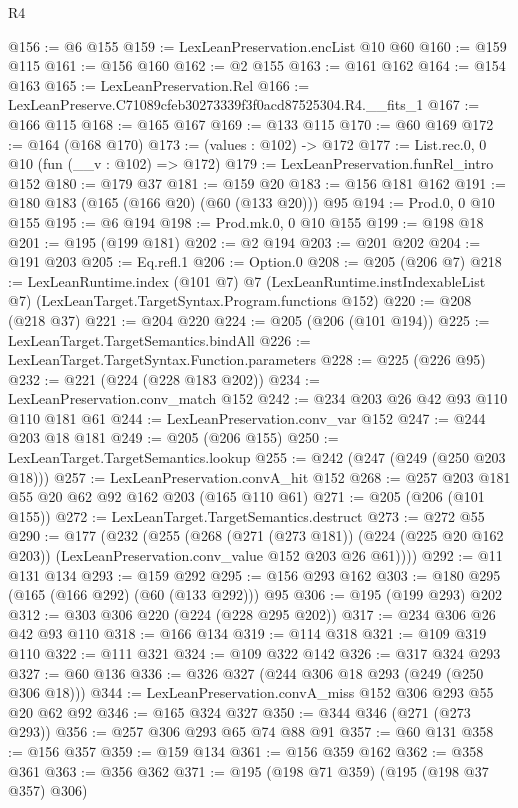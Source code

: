 \begin{lexlean}{R4}
\begin{coremodule}
@156 := @6 @155
@159 := LexLeanPreservation.encList @10 @60
@160 := @159 @115
@161 := @156 @160
@162 := @2 @155
@163 := @161 @162
@164 := @154 @163
@165 := LexLeanPreservation.Rel
@166 := LexLeanPreserve.C71089cfeb30273339f3f0acd87525304.R4.__fits_1
@167 := @166 @115
@168 := @165 @167
@169 := @133 @115
@170 := @60 @169
@172 := @164 (@168 @170)
@173 := (values : @102) -> @172
@177 := List.rec.{0, 0} @10 (fun (__v : @102) => @172)
@179 := LexLeanPreservation.funRel_intro @152
@180 := @179 @37
@181 := @159 @20
@183 := @156 @181 @162
@191 := @180 @183 (@165 (@166 @20) (@60 (@133 @20))) @95
@194 := Prod.{0, 0} @10 @155
@195 := @6 @194
@198 := Prod.mk.{0, 0} @10 @155
@199 := @198 @18
@201 := @195 (@199 @181)
@202 := @2 @194
@203 := @201 @202
@204 := @191 @203
@205 := Eq.refl.{1}
@206 := Option.{0}
@208 := @205 (@206 @7)
@218 := LexLeanRuntime.index
    (@101 @7)
    @7
    (LexLeanRuntime.instIndexableList @7)
    (LexLeanTarget.TargetSyntax.Program.functions @152)
@220 := @208 (@218 @37)
@221 := @204 @220
@224 := @205 (@206 (@101 @194))
@225 := LexLeanTarget.TargetSemantics.bindAll
@226 := LexLeanTarget.TargetSyntax.Function.parameters
@228 := @225 (@226 @95)
@232 := @221 (@224 (@228 @183 @202))
@234 := LexLeanPreservation.conv_match @152
@242 := @234 @203 @26 @42 @93 @110 @110 @181 @61
@244 := LexLeanPreservation.conv_var @152
@247 := @244 @203 @18 @181
@249 := @205 (@206 @155)
@250 := LexLeanTarget.TargetSemantics.lookup
@255 := @242 (@247 (@249 (@250 @203 @18)))
@257 := LexLeanPreservation.convA_hit @152
@268 := @257 @203 @181 @55 @20 @62 @92 @162 @203 (@165 @110 @61)
@271 := @205 (@206 (@101 @155))
@272 := LexLeanTarget.TargetSemantics.destruct
@273 := @272 @55
@290 := @177
    (@232
      (@255
        (@268
          (@271 (@273 @181))
          (@224 (@225 @20 @162 @203))
          (LexLeanPreservation.conv_value @152 @203 @26 @61))))
@292 := @11 @131 @134
@293 := @159 @292
@295 := @156 @293 @162
@303 := @180 @295 (@165 (@166 @292) (@60 (@133 @292))) @95
@306 := @195 (@199 @293) @202
@312 := @303 @306 @220 (@224 (@228 @295 @202))
@317 := @234 @306 @26 @42 @93 @110
@318 := @166 @134
@319 := @114 @318
@321 := @109 @319 @110
@322 := @111 @321
@324 := @109 @322 @142
@326 := @317 @324 @293
@327 := @60 @136
@336 := @326 @327 (@244 @306 @18 @293 (@249 (@250 @306 @18)))
@344 := LexLeanPreservation.convA_miss @152 @306 @293 @55 @20 @62 @92
@346 := @165 @324 @327
@350 := @344 @346 (@271 (@273 @293))
@356 := @257 @306 @293 @65 @74 @88 @91
@357 := @60 @131
@358 := @156 @357
@359 := @159 @134
@361 := @156 @359 @162
@362 := @358 @361
@363 := @356 @362
@371 := @195 (@198 @71 @359) (@195 (@198 @37 @357) @306)

\end{coremodule}
\end{lexlean}
